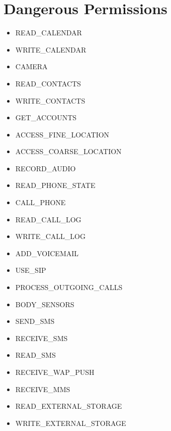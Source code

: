 \section*{Dangerous Permissions}
\begin{itemize}
\item[] READ\_CALENDAR
\item[] WRITE\_CALENDAR
\item[] CAMERA
\item[] READ\_CONTACTS
\item[] WRITE\_CONTACTS
\item[] GET\_ACCOUNTS
\item[] ACCESS\_FINE\_LOCATION
\item[] ACCESS\_COARSE\_LOCATION
\item[] RECORD\_AUDIO
\item[] READ\_PHONE\_STATE
\item[] CALL\_PHONE
\item[] READ\_CALL\_LOG
\item[] WRITE\_CALL\_LOG
\item[] ADD\_VOICEMAIL
\item[] USE\_SIP
\item[] PROCESS\_OUTGOING\_CALLS
\item[] BODY\_SENSORS
\item[] SEND\_SMS
\item[] RECEIVE\_SMS
\item[] READ\_SMS
\item[] RECEIVE\_WAP\_PUSH
\item[] RECEIVE\_MMS
\item[] READ\_EXTERNAL\_STORAGE
\item[] WRITE\_EXTERNAL\_STORAGE
\end{itemize}

